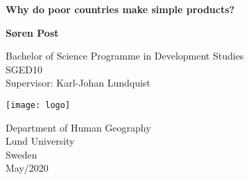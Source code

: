 \begin{titlepage}
    \begin{center}
        \vspace*{1cm}

        \Huge
        \textbf{Why do poor countries make simple products?}

        \vspace{0.5cm}
        \LARGE

        \vspace{1.5cm}

        \textbf{Søren Post}

        \vfill

     Bachelor of Science Programme in Development Studies \\
     SGED10\\
     Supervisor: Karl-Johan Lundquist

        \vspace{0.8cm}

        \texttt{[image: logo]}

        \Large
        Department of Human Geography\\
        Lund University\\
        Sweden\\
        May/2020

    \end{center}
\end{titlepage}
